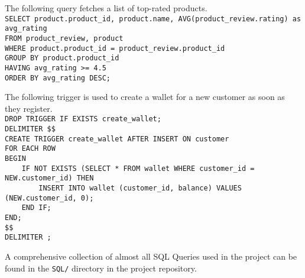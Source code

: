 \begin{sqlquery}
The following query fetches a list of top-rated products.
\vspace*{5pt} \\
\verb|SELECT product.product_id, product.name, AVG(product_review.rating) as avg_rating | \\
\verb|FROM product_review, product                                                      | \\
\verb|WHERE product.product_id = product_review.product_id                              | \\
\verb|GROUP BY product.product_id                                                       | \\
\verb|HAVING avg_rating >= 4.5                                                          | \\
\verb|ORDER BY avg_rating DESC;                                                         |
\end{sqlquery}

\begin{sqlquery}
The following trigger is used to create a wallet for a new customer as soon as they register.
\vspace*{5pt} \\
\verb|DROP TRIGGER IF EXISTS create_wallet;                                             | \\
\verb|DELIMITER $$                                                                      | \\
\verb|CREATE TRIGGER create_wallet AFTER INSERT ON customer                             | \\
\verb|FOR EACH ROW                                                                      | \\
\verb|BEGIN                                                                             | \\
\verb|    IF NOT EXISTS (SELECT * FROM wallet WHERE customer_id = NEW.customer_id) THEN | \\
\verb|        INSERT INTO wallet (customer_id, balance) VALUES (NEW.customer_id, 0);    | \\
\verb|    END IF;                                                                       | \\
\verb|END;                                                                              | \\
\verb|$$                                                                                | \\
\verb|DELIMITER ;                                                                       |
\end{sqlquery}

\vspace*{-15pt}

A comprehensive collection of almost all SQL Queries used in the project can be found in the \texttt{SQL/} directory in the project repository.

\vspace*{-45pt}